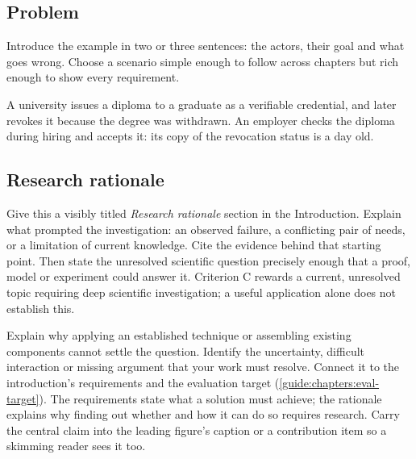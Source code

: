 \subsection[Problem]{Problem\skimmark}\label{guide:chapters:problem}
Introduce the example in two or three sentences: the actors, their goal and what goes wrong. Choose a scenario simple enough to follow across chapters but rich enough to show every requirement.
\begin{runningexample}
A university issues a diploma to a graduate as a verifiable credential, and later revokes it because the degree was withdrawn. An employer checks the diploma during hiring and accepts it: its copy of the revocation status is a day old.
\end{runningexample}

\subsection{Research rationale}\label{guide:chapters:rationale}
Give this a visibly titled \emph{Research rationale} section in the Introduction. Explain what prompted the investigation: an observed failure, a conflicting pair of needs, or a limitation of current knowledge. Cite the evidence behind that starting point. Then state the unresolved scientific question precisely enough that a proof, model or experiment could answer it. Criterion C rewards a current, unresolved topic requiring deep scientific investigation; a useful application alone does not establish this.

Explain why applying an established technique or assembling existing components cannot settle the question. Identify the uncertainty, difficult interaction or missing argument that your work must resolve. Connect it to the introduction's requirements and the evaluation target (\cref{guide:chapters:eval-target}). The requirements state what a solution must achieve; the rationale explains why finding out whether and how it can do so requires research. Carry the central claim into the leading figure's caption or a contribution item so a skimming reader sees it too.

